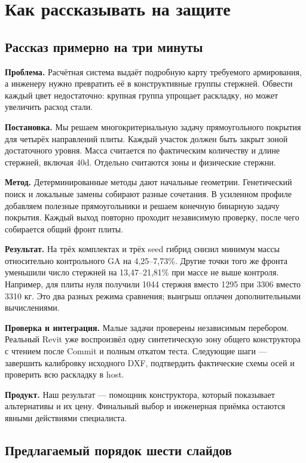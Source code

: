\documentclass[11pt,a4paper]{article}
\begin{document}
\section{Как рассказывать на защите}

\subsection{Рассказ примерно на три минуты}

\textbf{Проблема.} Расчётная система выдаёт подробную карту требуемого армирования, а инженеру нужно превратить её в конструктивные группы стержней. Обвести каждый цвет недостаточно: крупная группа упрощает раскладку, но может увеличить расход стали.


\textbf{Постановка.} Мы решаем многокритериальную задачу прямоугольного покрытия для четырёх направлений плиты. Каждый участок должен быть закрыт зоной достаточного уровня. Масса считается по фактическим количеству и длине стержней, включая 40d. Отдельно считаются зоны и физические стержни.


\textbf{Метод.} Детерминированные методы дают начальные геометрии. Генетический поиск и локальные замены собирают разные сочетания. В усиленном профиле добавляем полезные прямоугольники и решаем конечную бинарную задачу покрытия. Каждый выход повторно проходит независимую проверку, после чего собирается общий фронт плиты.


\textbf{Результат.} На трёх комплектах и трёх seed гибрид снизил минимум массы относительно контрольного GA на 4,25–7,73\%. Другие точки того же фронта уменьшили число стержней на 13,47–21,81\% при массе не выше контроля. Например, для плиты нуля получили 1044 стержня вместо 1295 при 3306 вместо 3310 кг. Это два разных режима сравнения; выигрыш оплачен дополнительными вычислениями.


\textbf{Проверка и интеграция.} Малые задачи проверены независимым перебором. Реальный Revit уже воспроизвёл одну синтетическую зону общего конструктора с чтением после Commit и полным откатом теста. Следующие шаги — завершить калибровку исходного DXF, подтвердить фактические схемы осей и проверить всю раскладку в host.


\textbf{Продукт.} Наш результат — помощник конструктора, который показывает альтернативы и их цену. Финальный выбор и инженерная приёмка остаются явными действиями специалиста.


\subsection{Предлагаемый порядок шести слайдов}
\end{document}
